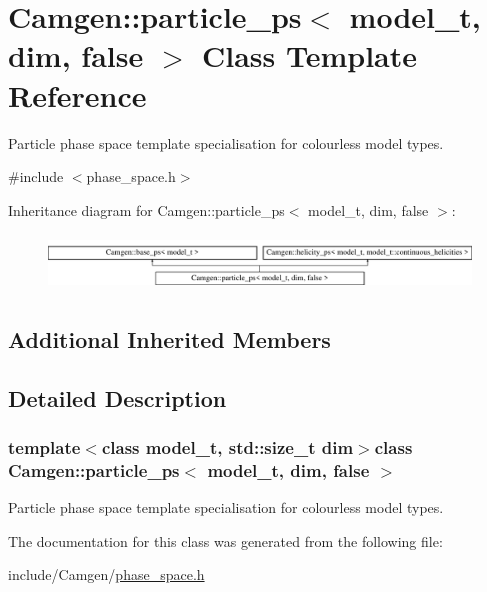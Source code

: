 \hypertarget{a00403}{\section{Camgen\-:\-:particle\-\_\-ps$<$ model\-\_\-t, dim, false $>$ Class Template Reference}
\label{a00403}
}


Particle phase space template specialisation for colourless model types.  




{\ttfamily \#include $<$phase\-\_\-space.\-h$>$}

Inheritance diagram for Camgen\-:\-:particle\-\_\-ps$<$ model\-\_\-t, dim, false $>$\-:\begin{figure}[H]
\begin{center}
\leavevmode
\includegraphics[height=1.497326cm]{a00403}
\end{center}
\end{figure}
\subsection*{Additional Inherited Members}


\subsection{Detailed Description}
\subsubsection*{template$<$class model\-\_\-t, std\-::size\-\_\-t dim$>$class Camgen\-::particle\-\_\-ps$<$ model\-\_\-t, dim, false $>$}

Particle phase space template specialisation for colourless model types. 

The documentation for this class was generated from the following file\-:\begin{DoxyCompactItemize}
\item 
include/\-Camgen/\hyperlink{a00694}{phase\-\_\-space.\-h}\end{DoxyCompactItemize}
